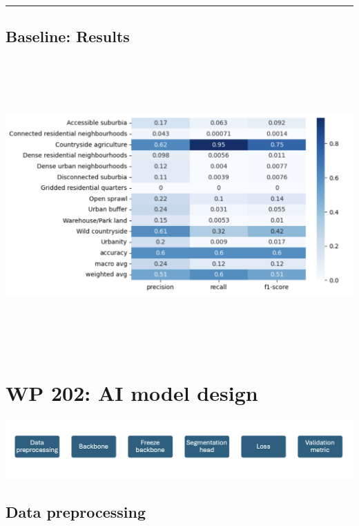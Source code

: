 \documentclass[
  letterpaper,
  DIV=11,
  numbers=noendperiod]{scrartcl}
\begin{document}
\begin{center}\rule{0.5\linewidth}{0.5pt}\end{center}

\subsection{Baseline: Results}\label{baseline-results}

\begin{center}
\includegraphics[width=\textwidth,height=4.375in]{../figures/algo_design/baseline_tile_level.png}
\end{center}

\section{WP 202: AI model design}\label{wp-202-ai-model-design}

\begin{center}
\includegraphics{../figures/algo_design/overview.png}
\end{center}

\subsection{Data preprocessing}\label{data-preprocessing}
\end{document}
